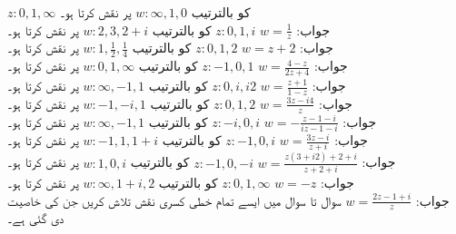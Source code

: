 \quad
$z:0,1,\infty$
کو بالترتیب
$w:\infty,1,0$
پر نقش کرتا ہو۔\\
جواب:\quad
$w=\tfrac{1}{z}$
\quad
$z:0,1,i$
کو بالترتیب
$w:2,3,2+i$
پر نقش کرتا ہو۔\\
جواب:\quad
$w=z+2$
\quad
$z:0,1,2$
کو بالترتیب
$w:1,\tfrac{1}{2},\tfrac{1}{4}$
پر نقش کرتا ہو۔\\
جواب:\quad
$w=\tfrac{4-z}{2z+4}$
\quad
$z:-1,0,1$
کو بالترتیب
$w:0,1,\infty$
پر نقش کرتا ہو۔\\
جواب:\quad
$w=\tfrac{z+1}{1-z}$
\quad
$z:0,i,i2$
کو بالترتیب
$w:\infty,-1,1$
پر نقش کرتا ہو۔\\
جواب:\quad
$w=\tfrac{3z-i4}{z}$
\quad
$z:0,1,2$
کو بالترتیب
$w:-1,-i,1$
پر نقش کرتا ہو۔\\
جواب:\quad
$w=-\tfrac{z-1-i}{iz-1-i}$
\quad
$z:-i,0,i$
کو بالترتیب
$w:\infty,-1,1$
پر نقش کرتا ہو۔\\
جواب:\quad
$w=\tfrac{3z-i}{z+i}$
\quad
$z:-1,0,i$
کو بالترتیب
$w:-1,1,1+i$
پر نقش کرتا ہو۔\\
جواب:\quad
$w=\tfrac{z(3+i2)+2+i}{z+2+i}$
\quad
$z:-1,0,-i$
کو بالترتیب
$w:1,0,i$
پر نقش کرتا ہو۔\\
جواب:\quad
$w=-z$
\quad
$z:0,1,\infty$
کو بالترتیب
$w:\infty,1+i,2$
پر نقش کرتا ہو۔\\
جواب:\quad
$w=\tfrac{2z-1+i}{z}$
سوال  تا سوال  میں ایسے تمام خطی کسری نقش تلاش کریں جن کی خاصیت دی گئی ہے۔

